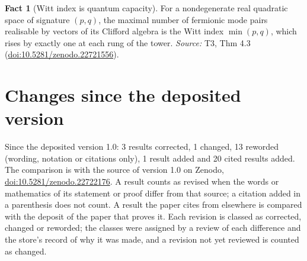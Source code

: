 \documentclass[11pt]{article}
\theoremstyle{definition}
\newtheorem{fact}[theorem]{Fact}
\theoremstyle{plain}
\begin{document}
\begin{fact}[Witt index is quantum capacity]\label{c:tower.witt-index-quantum-capacity}
For a nondegenerate real quadratic space of signature $(p,q)$, the maximal number of fermionic mode pairs realisable by vectors of its Clifford algebra is the Witt index $\min(p,q)$, which rises by exactly one at each rung of the tower.
\emph{Source:} T3, Thm 4.3 (\href{https://doi.org/10.5281/zenodo.22721556}{doi:10.5281/zenodo.22721556}).
\end{fact}

\section*{Changes since the deposited version}
Since the deposited version 1.0: 3 results corrected, 1 changed, 13 reworded (wording, notation or citations only), 1 result added and 20 cited results added. The comparison is with the source of version 1.0 on Zenodo, \href{https://doi.org/10.5281/zenodo.22722176}{doi:10.5281/zenodo.22722176}. A result counts as revised when the words or mathematics of its statement or proof differ from that source; a citation added in a parenthesis does not count. A result the paper cites from elsewhere is compared with the deposit of the paper that proves it. Each revision is classed as corrected, changed or reworded; the classes were assigned by a review of each difference and the store's record of why it was made, and a revision not yet reviewed is counted as changed.
\end{document}
